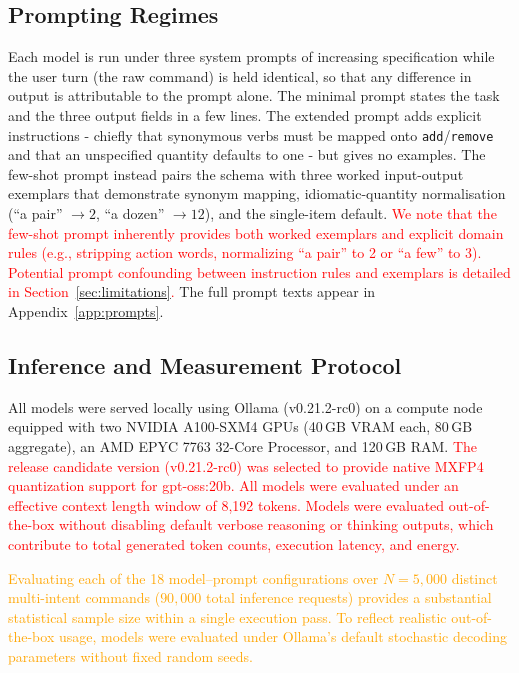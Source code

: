 \documentclass[journal,article,submit,pdftex,moreauthors]{Definitions/mdpi}
\begin{document}
\subsection{Prompting Regimes}\label{sec:prompts}

Each model is run under three system prompts of increasing specification while the user turn (the raw command) is held identical, so that any difference in output is attributable to the prompt alone. The minimal prompt states the task and the three output fields in a few lines. The extended prompt adds explicit instructions - chiefly that synonymous verbs must be mapped onto \texttt{add}/\texttt{remove} and that an unspecified quantity defaults to one - but gives no examples. The few-shot prompt instead pairs the schema with three worked input-output exemplars that demonstrate synonym mapping, idiomatic-quantity normalisation (``a pair'' $\rightarrow 2$, ``a dozen'' $\rightarrow 12$), and the single-item default. \textcolor{red}{We note that the few-shot prompt inherently provides both worked exemplars and explicit domain rules (e.g., stripping action words, normalizing ``a pair'' to 2 or ``a few'' to 3). Potential prompt confounding between instruction rules and exemplars is detailed in Section~\ref{sec:limitations}.} The full prompt texts appear in Appendix~\ref{app:prompts}.

\subsection{Inference and Measurement Protocol}\label{sec:protocol}

All models were served locally using Ollama (v0.21.2-rc0) on a compute node equipped with two NVIDIA A100-SXM4 GPUs (40\,GB VRAM each, 80\,GB aggregate), an AMD EPYC 7763 32-Core Processor, and 120\,GB RAM. \textcolor{red}{The release candidate version (v0.21.2-rc0) was selected to provide native MXFP4 quantization support for gpt-oss:20b. All models were evaluated under an effective context length window of 8,192 tokens. Models were evaluated out-of-the-box without disabling default verbose reasoning or thinking outputs, which contribute to total generated token counts, execution latency, and energy.}

\textcolor{orange}{Evaluating each of the 18 model--prompt configurations over $N=5,000$ distinct multi-intent commands ($90,000$ total inference requests) provides a substantial statistical sample size within a single execution pass. To reflect realistic out-of-the-box usage, models were evaluated under Ollama's default stochastic decoding parameters without fixed random seeds.}
\end{document}
